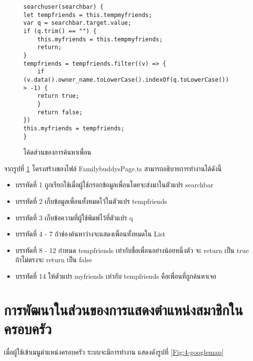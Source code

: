 \begin{figure}[H]
{\lstset{language=Pascal}
\begin{lstlisting}
searchuser(searchbar) {
let tempfriends = this.tempmyfriends;
var q = searchbar.target.value;
if (q.trim() == "") {
	this.myfriends = this.tempmyfriends;
	return;
}
tempfriends = tempfriends.filter((v) => {
	if (v.data().owner_name.toLowerCase().indexOf(q.toLowerCase()) > -1) {
	return true;
	}
	return false;
})
this.myfriends = tempfriends;
}
\end{lstlisting}}
\caption{โค้ดส่วนของการค้นหาเพื่อน}
\label{Fig:4-addfamily}
\end{figure}

จากรูปที่ \ref{Fig:4-addfamily} โครงสร้างของไฟล์ FamilybuddysPage.ts สามารถอธิบายการทำงานได้ดังนี้
\begin{itemize}[label={--}]
\item บรรทัดที่ 1 ถูกเรียกใช้เมื่อผู้ใช้กรอกข้อมูลเพื่อนโดยจะส่งมาในตัวแปร searchbar
\item บรรทัดที่ 2 เก็บข้อมูลเพื่อนทั้งหมดไว้ในตัวแปร tempfriends
\item บรรทัดที่ 3 เก็บข้อความที่ผู้ใช้พิมพ์ไว้ที่ตัวแปร q
\item บรรทัดที่ 4 - 7 ถ้าช่องค้นหาว่างจะแสดงเพื่อนทั้งหมดใน List
\item บรรทัดที่ 8 - 12 กำหนด tempfriends เท่ากับชื่อเพื่อนอย่างน้อยหนึ่งตัว จะ return เป็น true ถ้าไม่ตรงจะ return เป็น false
\item บรรทัดที่ 14 ให้ตัวแปร myfriends เท่ากับ tempfriends คือเพื่อนที่ถูกค้นหาเจอ
\end{itemize}
\newpage



\section{การพัฒนาในส่วนของการแสดงตำแหน่งสมาชิกในครอบครัว}
เมื่อผู้ใช้เข้าเมนูตำแหน่งครอบครัว ระบบจะมีการทำงาน แสดงดังรูปที่ \ref{Fig:4-googlemap}

